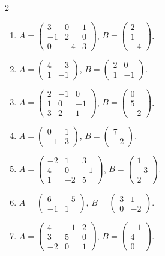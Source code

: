 \begin{multicols}{2}
\begin{enumerate}[label=\arabic*.,  leftmargin=*]
\item $A=\begin{pmatrix}3&0&1\\-1&2&0\\0&-4&3\end{pmatrix}$, $B=\begin{pmatrix}2\\1\\-4\end{pmatrix}$.
\item $A=\begin{pmatrix}4&-3\\1&-1\end{pmatrix}$, $B=\begin{pmatrix}2&0\\1&-1\end{pmatrix}$.
\item $A=\begin{pmatrix}2&-1&0\\1&0&-1\\3&2&1\end{pmatrix}$, $B=\begin{pmatrix}0\\5\\-2\end{pmatrix}$.
\item $A=\begin{pmatrix}0&1\\-1&3\end{pmatrix}$, $B=\begin{pmatrix}7\\-2\end{pmatrix}$.
\item $A=\begin{pmatrix}-2&1&3\\4&0&-1\\1&-2&5\end{pmatrix}$, $B=\begin{pmatrix}1\\-3\\2\end{pmatrix}$.
\item $A=\begin{pmatrix}6&-5\\-1&1\end{pmatrix}$, $B=\begin{pmatrix}3&1\\0&-2\end{pmatrix}$.
\item $A=\begin{pmatrix}4&-1&2\\3&5&0\\-2&0&1\end{pmatrix}$, $B=\begin{pmatrix}-1\\4\\0\end{pmatrix}$.

\end{enumerate}
\end{multicols}
